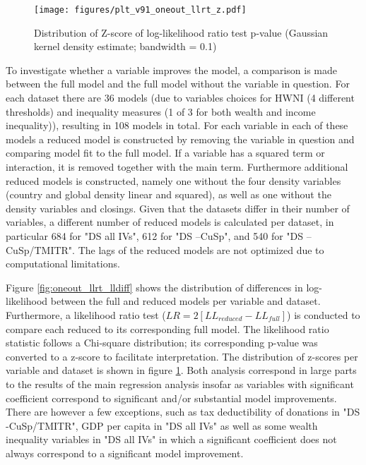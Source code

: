 \documentclass[11pt]{article}
\begin{document}
\begin{figure}[htbp]
\centering
\texttt{[image: figures/plt\_v91\_oneout\_llrt\_z.pdf]}
\caption{\label{fig:oneout_llrt_z}Distribution of Z-score of log-likelihood ratio test p-value (Gaussian kernel density estimate; bandwidth = 0.1)}
\end{figure}

To investigate whether a variable improves the model, a comparison is made between the full model and the full model without the variable in question.
For each dataset there are 36 models (due to variables choices for HWNI (4 different thresholds) and inequality measures (1 of 3 for both wealth and income inequality)), resulting in 108 models in total. 
For each variable in each of these models a reduced model is constructed by removing the variable in question and comparing model fit to the full model.
If a variable has a squared term or interaction, it is removed together with the main term.
Furthermore additional reduced models is constructed, namely one without the four density variables (country and global density linear and squared), as well as one without the density variables and closings.
Given that the datasets differ in their number of variables, a different number of reduced models is calculated per dataset, in particular 684 for "DS all IVs", 612 for "DS --CuSp", and 540 for "DS --CuSp/TMITR". 
The lags of the reduced models are not optimized due to computational limitations. 



Figure \ref{fig:oneout_llrt_lldiff} shows the distribution of differences in log-likelihood between the full and reduced models per variable and dataset.
Furthermore, a likelihood ratio test (\(LR = 2[LL_{reduced} - LL_{full}]\)) is conducted to compare each reduced to its corresponding full model.
The likelihood ratio statistic follows a Chi-square distribution; its corresponding p-value was converted to a z-score to facilitate interpretation.
The distribution of z-scores per variable and dataset is shown in figure \ref{fig:oneout_llrt_z}.
Both analysis correspond in large parts to the results of the main regression analysis  insofar as variables with significant coefficient correspond to significant and/or substantial model improvements.
There are however a few exceptions, such as tax deductibility of donations in "DS -CuSp/TMITR", GDP per capita in "DS all IVs" as well as some  wealth inequality variables in "DS all IVs" in which a significant coefficient does not always correspond to a significant model improvement. 
\end{document}
